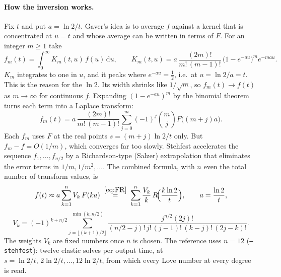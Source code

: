 \documentclass[11pt]{article}
\numberwithin{equation}{section}
\newcommand{\code}[1]{\texttt{#1}}
\begin{document}
\paragraph{How the inversion works.}
Fix $t$ and put $a=\ln 2/t$. Gaver's idea is to average $f$ against a
kernel that is concentrated at $u=t$ and whose average can be written in
terms of $F$. For an integer $m\ge1$ take
\begin{equation}
  f_m(t) = \int_0^\infty K_m(t,u)\,f(u)\,\mathrm{d}u,\qquad
  K_m(t,u) = a\,\frac{(2m)!}{m!\,(m-1)!}\,
             \bigl(1-e^{-au}\bigr)^m e^{-mau}.
\end{equation}
$K_m$ integrates to one in $u$, and it peaks where $e^{-au}=\tfrac12$,
i.e.\ at $u=\ln2/a=t$. This is the reason for the $\ln2$. Its width
shrinks like $1/\sqrt m$, so $f_m(t)\to f(t)$ as $m\to\infty$ for
continuous $f$. Expanding $(1-e^{-au})^m$ by the binomial theorem turns
each term into a Laplace transform:
\begin{equation}
  f_m(t) = a\,\frac{(2m)!}{m!\,(m-1)!}\sum_{j=0}^{m}(-1)^j\binom mj
           F\bigl((m+j)a\bigr).
\end{equation}
Each $f_m$ uses $F$ at the real points $s=(m+j)\ln2/t$ only. But
$f_m-f=O(1/m)$, which converges far too slowly. Stehfest accelerates the
sequence $f_1,\dots,f_{n/2}$ by a Richardson-type (Salzer) extrapolation
that eliminates the error terms in $1/m,1/m^2,\dots$. The combined
formula, with $n$ even the total number of transform values, is
\begin{equation}
  f(t) \approx a\sum_{k=1}^{n}V_k\,F(ka)
  \;\overset{\eqref{eq:FR}}{=}\;
  \sum_{k=1}^{n}\frac{V_k}{k}\,R\!\Bigl(\frac{k\ln 2}{t}\Bigr),
  \qquad a=\frac{\ln2}{t},
  \label{eq:stehfest}
\end{equation}
\begin{equation}
  V_k = (-1)^{k+n/2}\sum_{j=\lfloor (k+1)/2\rfloor}^{\min(k,n/2)}
   \frac{j^{n/2}(2j)!}{(n/2-j)!\,j!\,(j-1)!\,(k-j)!\,(2j-k)!}.
\end{equation}
The weights $V_k$ are fixed numbers once $n$ is chosen. The reference
uses $n=12$ (\code{--stehfest}): twelve elastic solves per output time, at
$s=\ln2/t,\,2\ln2/t,\dots,12\ln2/t$, from which every Love number at
every degree is read.
\end{document}
